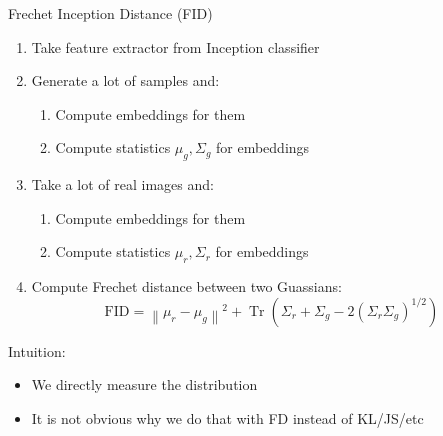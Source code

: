 \documentclass[10pt]{beamer}
\begin{document}
\begin{frame}{Frechet Inception Distance (FID)}
    \begin{enumerate}
        \item\pause Take feature extractor from Inception classifier
        \item\pause Generate a lot of samples and:
            \begin{enumerate}
                \item\pause Compute embeddings for them
                \item\pause Compute statistics $\mu_g, \Sigma_g$ for embeddings
            \end{enumerate}
        \item\pause Take a lot of real images and:
            \begin{enumerate}
                \item\pause Compute embeddings for them
                \item\pause Compute statistics $\mu_r, \Sigma_r$ for embeddings
            \end{enumerate}
        \item\pause Compute Frechet distance between two Guassians:
\begin{equation}
\mathrm{FID}=\left\|\mu_{r}-\mu_{g}\right\|^{2}+\operatorname{Tr}\left(\Sigma_{r}+\Sigma_{g}-2\left(\Sigma_{r} \Sigma_{g}\right)^{1 / 2}\right)
\end{equation}
\end{enumerate}

\pause
Intuition:
\begin{itemize}
    \item\pause We directly measure the distribution
    \item\pause It is not obvious why we do that with FD instead of KL/JS/etc
\end{itemize}
    
\end{frame}
\end{document}
